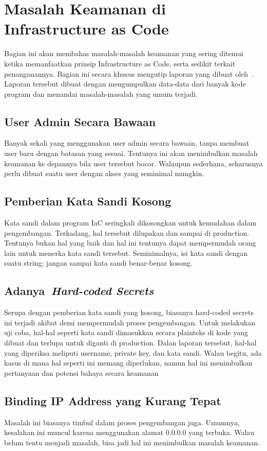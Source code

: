 \section{Masalah Keamanan di Infrastructure as Code}

Bagian ini akan membahas masalah-masalah keamanan yang sering ditemui ketika memanfaatkan prinsip Infrastructure as Code, serta sedikit terkait penanganannya. Bagian ini secara khusus mengutip laporan yang dibuat oleh~\cite{8812041}. Laporan tersebut dibuat dengan mengumpulkan data-data dari banyak kode program dan menandai masalah-masalah yang umum terjadi.

\subsection{User Admin Secara Bawaan}
Banyak sekali yang menggunakan user admin secara bawaan, tanpa membuat user baru dengan batasan yang sesuai. Tentunya ini akan menimbulkan masalah keamanan ke depannya bila user tersebut bocor. Walaupun sederhana, seharusnya perlu dibuat suatu user dengan akses yang seminimal mungkin.

\subsection{Pemberian Kata Sandi Kosong}
Kata sandi dalam program IaC seringkali dikosongkan untuk kemudahan dalam pengembangan. Terkadang, hal tersebut dilupakan dan sampai di production. Tentunya bukan hal yang baik dan hal ini tentunya dapat mempermudah orang lain untuk menerka kata sandi tersebut. Seminimalnya, isi kata sandi dengan suatu string; jangan sampai kata sandi benar-benar kosong.

\subsection{Adanya~\textit{Hard-coded Secrets}}
Serupa dengan pemberian kata sandi yang kosong, biasanya hard-coded secrets ini terjadi akibat demi mempermudah proses pengembangan. Untuk melakukan uji coba, hal-hal seperti kata sandi dimasukkan secara plainteks di kode yang dibuat dan terlupa untuk diganti di production. Dalan laporan tersebut, hal-hal yang diperiksa meliputi username, private key, dan kata sandi. Walau begitu, ada kasus di mana hal seperti ini memang diperlukan, namun hal ini menimbulkan pertanyaan dan potensi bahaya secara keamanan

\subsection{Binding IP Address yang Kurang Tepat}
Masalah ini biasanya timbul dalam proses pengembangan juga. Umumnya, kesalahan ini muncul karena menggunakan alamat 0.0.0.0 yang terbuka. Walau belum tentu menjadi masalah, bisa jadi hal ini menimbulkan masalah keamanan.

